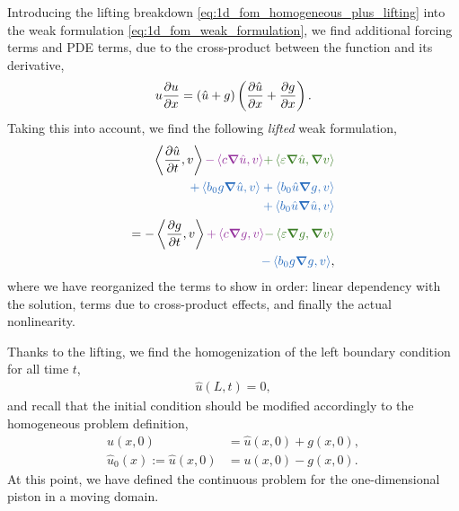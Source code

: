 \documentclass[../../thesis.tex]{subfiles}
\newcommand{\inner}[2]{\left<#1, #2\right>}
\begin{document}
Introducing the lifting breakdown \eqref{eq:1d_fom_homogeneous_plus_lifting} into the weak formulation \eqref{eq:1d_fom_weak_formulation},
we find additional forcing terms and PDE terms, due to the cross-product between the function and its derivative, 
\begin{equation}
    u \pdv{u}{x} = \left(\hat{u} + g\right)\left(\pdv{\hat{u}}{x} + \pdv{g}{x}\right).
\end{equation}
Taking this into account, we find the following \textit{lifted} weak formulation,
\begin{subequations}
    \label{eq:1d_fom_weak_formulation_homogeneous}
    \begin{align}
        \inner{\frac{\partial \hat{u}}{\partial t}}{v} \textcolor{Purple}{- \inner{c \grad \hat{u}}{v}} \textcolor{OliveGreen}{+ \inner{\varepsilon \grad \hat{u}}{\grad v}} \nonumber\\
        \textcolor{NavyBlue}{+ \inner{b_0 g \grad \hat{u}}{v}
        + \inner{b_0 \hat{u} \grad g}{v}} \nonumber\\
        \textcolor{NavyBlue}{+ \inner{b_0 \hat{u} \grad \hat{u}}{v}} \nonumber\\
        = 
        - \inner{\frac{\partial g}{\partial t}}{v} \textcolor{Purple}{+ \inner{c \grad g}{v}} \textcolor{OliveGreen}{- \inner{\varepsilon \grad g}{\grad v}} \nonumber\\ 
        \textcolor{NavyBlue}{- \inner{b_0 g \grad g}{v}},
    \end{align}
\end{subequations}
where we have reorganized the terms to show in order: 
linear dependency with the solution, 
terms due to cross-product effects, and finally the actual nonlinearity.

Thanks to the lifting, we find the homogenization of the left boundary condition for all time $t$,
\begin{subequations}
    \begin{align}
        \hat{u}(L, t) = 0,
    \end{align}
\end{subequations}
and recall that the initial condition should be modified accordingly to the homogeneous problem definition, 
\begin{subequations}
    \begin{align}
    u(x,0) &= \hat{u}(x,0) + g(x,0), \\ 
    \hat{u}_0(x):= \hat{u}(x,0) &= u(x,0) - g(x,0). 
    \end{align}
\end{subequations}
At this point, we have defined the continuous problem for the one-dimensional piston in a moving domain.
\end{document}
